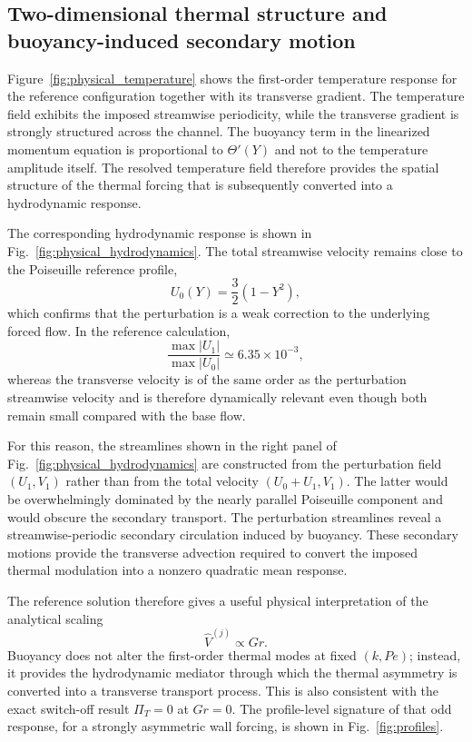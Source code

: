 \documentclass[12pt,a4paper]{article}
\newcommand{\Pe}{\mathit{Pe}}
\newcommand{\Grr}{\mathit{Gr}}
\newcommand{\PiT}{\Pi_T}
\begin{document}
\subsection{Two-dimensional thermal structure and buoyancy-induced
secondary motion}
\label{subsec:2d_reference}

Figure~\ref{fig:physical_temperature} shows the first-order temperature
response for the reference configuration together with its transverse
gradient. The temperature field exhibits the imposed streamwise periodicity,
while the transverse gradient is strongly structured across the channel.
The buoyancy term in the linearized momentum equation is proportional to
$\Theta'(Y)$ and not to the temperature amplitude itself. The resolved temperature field therefore
provides the spatial structure of the thermal forcing that is subsequently
converted into a hydrodynamic response.

The corresponding hydrodynamic response is shown in
Fig.~\ref{fig:physical_hydrodynamics}. The total streamwise velocity remains
close to the Poiseuille reference profile,
\begin{equation}
U_0(Y)=\frac{3}{2}(1-Y^2),
\end{equation}
which confirms that the perturbation is a weak correction to the underlying
forced flow. In the reference calculation,
\begin{equation}
\frac{\max |U_1|}{\max |U_0|}
\simeq 6.35\times10^{-3},
\label{eq:U1_U0_ratio}
\end{equation}
whereas the transverse velocity is of the same order as the perturbation
streamwise velocity and is therefore dynamically relevant even though both
remain small compared with the base flow.

For this reason, the streamlines shown in the right panel of
Fig.~\ref{fig:physical_hydrodynamics} are constructed from the perturbation
field $(U_1,V_1)$ rather than from the total velocity $(U_0+U_1,V_1)$.
The latter would be overwhelmingly dominated by the nearly parallel
Poiseuille component and would obscure the secondary transport. The
perturbation streamlines reveal a streamwise-periodic secondary circulation
induced by buoyancy. These secondary motions provide the transverse advection
required to convert the imposed thermal modulation into a nonzero quadratic
mean response.

The reference solution therefore gives a useful physical interpretation of
the analytical scaling
\begin{equation}
\widehat V^{(j)}\propto\Grr.
\end{equation}
Buoyancy does not alter the first-order thermal modes at fixed $(k,\Pe)$;
instead, it provides the hydrodynamic mediator through which the thermal
asymmetry is converted into a transverse transport process. This is also
consistent with the exact switch-off result $\PiT=0$ at $\Grr=0$. The profile-level signature of
that odd response, for a strongly asymmetric wall forcing, is shown in Fig.~\ref{fig:profiles}.
\end{document}
